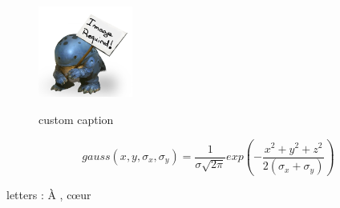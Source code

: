 

\begin{figure}
  \centering
  \includegraphics[height=3cm]{Images/img_required.jpg}
  \label{fig:custom_fig}
  \caption{custom caption}
\end{figure}


\begin{equation}
  gauss(x,y,\sigma_{x},\sigma_{y}) = \frac{1}{ \sigma\sqrt{2\pi} }exp(-\frac{x^2 + y^2 + z^2}{2(\sigma_{x}+ \sigma_{y}) })
\end{equation}

letters : À , cœur

